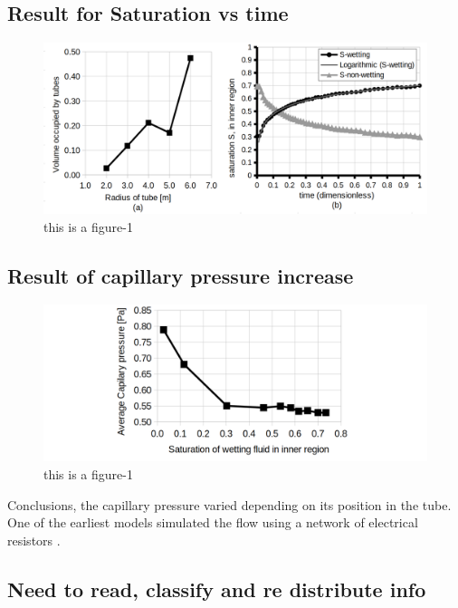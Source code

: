 \documentclass[
	12pt
] {article}
\begin{document}
\subsection{Result for Saturation vs time}

	\begin{figure}
		\centering
		\includegraphics[width=\textwidth]{fig_4_2200x1000}
		\caption{this is a figure-1}
		\label{fig:4}
	\end{figure}
	
	
\subsection{Result of capillary pressure increase}

	\begin{figure}
		\centering
		\includegraphics[width=\textwidth]{fig_5_2200x900}
		\caption{this is a figure-1}
		\label{fig:5}
	\end{figure}
	
	Conclusions, the capillary pressure varied depending on its position in the tube. One of the earliest models simulated the flow using a network of electrical resistors \cite{fatt1956network}. 
	
\subsection{Need to read, classify and re distribute info}
\end{document}
